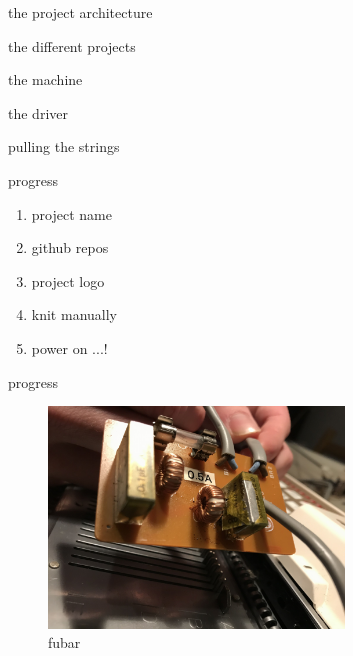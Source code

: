 \begin{frame}{the project architecture}
    \begin{figure}
    \end{figure}
\end{frame}


\begin{frame}{the different projects}
    \begin{description}[<+->]
        \item [knitt] the machine
        \item [michael] the driver
        \item [devon] pulling the strings
    \end{description}
\end{frame}


\begin{frame}{progress}
    \begin{enumerate}
        \item project name \pause \emojiCheck \pause
        \item github repos \pause \emojiCheck \pause
        \item project logo \pause \emojiCheck \pause
        \item knit manually \pause \emojiCheck \pause
        \item power on ...! \pause
    \end{enumerate}

    \center
     \pause %
     \pause %
     \pause %
     \pause %
\end{frame}


\begin{frame}{progress}
    \begin{figure}
        \includegraphics[width=0.7\textwidth]{./images/exploded-capacitor.png}
        \caption{fubar}
    \end{figure}
\end{frame}

